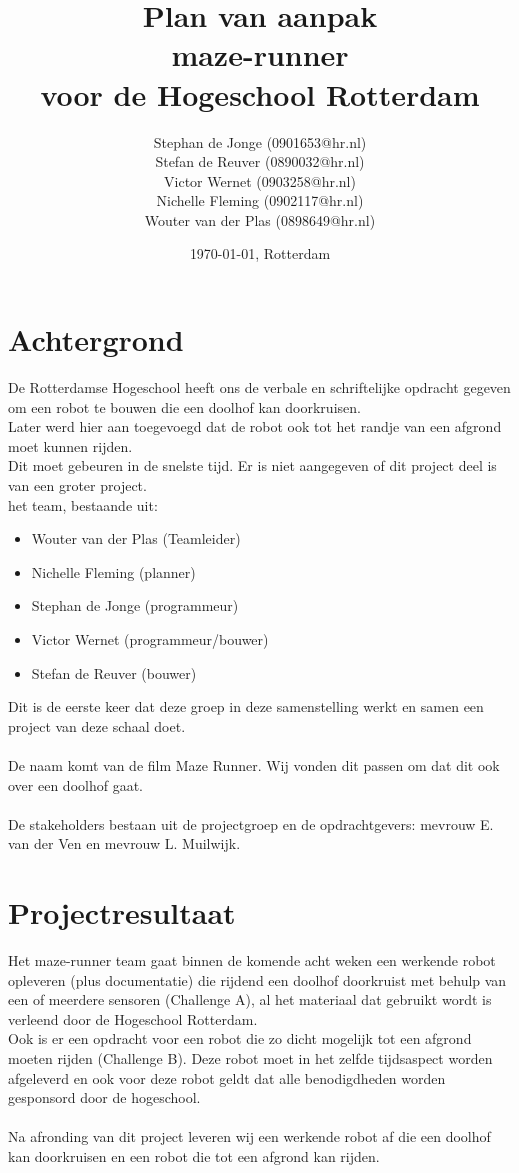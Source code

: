 \documentclass[oneside]{book}
\title{Plan van aanpak\\
maze-runner\\
\normalsize voor de Hogeschool Rotterdam
}
\author{
	Stephan de Jonge (0901653@hr.nl)\\
	Stefan de Reuver (0890032@hr.nl)\\
	Victor Wernet (0903258@hr.nl)\\
	Nichelle Fleming (0902117@hr.nl)\\
	Wouter van der Plas (0898649@hr.nl)
}
\date{\today, Rotterdam}
\begin{document}
\maketitle
\tableofcontents


\chapter{Achtergrond}

De Rotterdamse Hogeschool heeft ons de verbale en schriftelijke opdracht gegeven om een robot te bouwen die een doolhof kan doorkruisen.\\
Later werd hier aan toegevoegd dat de robot ook tot het randje van een afgrond moet kunnen rijden.\\
Dit moet gebeuren in de snelste tijd. Er is niet aangegeven of dit project deel is van een groter project.\\
het team, bestaande uit:\\
\begin{itemize}
	\item Wouter van der Plas (Teamleider)
	\item Nichelle Fleming (planner)
	\item Stephan de Jonge (programmeur)
	\item Victor Wernet (programmeur/bouwer)
	\item Stefan de Reuver (bouwer)
\end{itemize}	
Dit is de eerste keer dat deze groep in deze samenstelling werkt en samen een project van deze schaal doet.\\
\\
De naam komt van de film Maze Runner. Wij vonden dit passen om dat dit ook over een doolhof gaat.\\
\\
De stakeholders bestaan uit de projectgroep en de opdrachtgevers: mevrouw E. van der Ven en mevrouw L. Muilwijk.

\clearpage
\chapter{Projectresultaat}
Het maze-runner team gaat binnen de komende acht weken een werkende robot opleveren (plus documentatie) die rijdend een doolhof doorkruist met behulp van een of meerdere sensoren (Challenge A), al het materiaal dat gebruikt wordt is verleend door de Hogeschool Rotterdam.\\
Ook is er een opdracht voor een robot die zo dicht mogelijk tot een afgrond moeten rijden (Challenge B). Deze robot moet in het zelfde tijdsaspect worden afgeleverd en ook voor deze robot geldt dat alle benodigdheden worden gesponsord door de hogeschool.\\
\\
Na afronding van dit project leveren wij een werkende robot af die een doolhof kan doorkruisen en een robot die tot een afgrond kan rijden.
\clearpage
\end{document}
